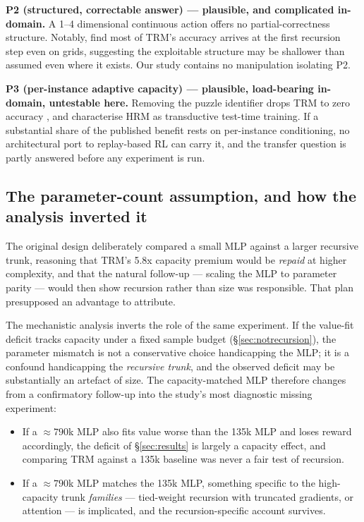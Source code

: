 \documentclass[11pt]{article}
\begin{document}
\textbf{P2 (structured, correctable answer) --- plausible, and complicated in-domain.} A 1--4 dimensional continuous action offers no partial-correctness structure. Notably, \citet{royeazar2026trm} find most of TRM's accuracy arrives at the first recursion step even on grids, suggesting the exploitable structure may be shallower than assumed even where it exists. Our study contains no manipulation isolating P2.

\textbf{P3 (per-instance adaptive capacity) --- plausible, load-bearing in-domain, untestable here.} Removing the puzzle identifier drops TRM to zero accuracy \citep{royeazar2026trm}, and \citet{arcprize2025hrm} characterise HRM as transductive test-time training. If a substantial share of the published benefit rests on per-instance conditioning, no architectural port to replay-based RL can carry it, and the transfer question is partly answered before any experiment is run.

\subsection{The parameter-count assumption, and how the analysis inverted it}
\label{sec:paramflip}

The original design deliberately compared a small MLP against a larger recursive trunk, reasoning that TRM's 5.8x capacity premium would be \emph{repaid} at higher complexity, and that the natural follow-up --- scaling the MLP to parameter parity --- would then show recursion rather than size was responsible. That plan presupposed an advantage to attribute.

The mechanistic analysis inverts the role of the same experiment. If the value-fit deficit tracks capacity under a fixed sample budget (\S\ref{sec:notrecursion}), the parameter mismatch is not a conservative choice handicapping the MLP; it is a confound handicapping the \emph{recursive trunk}, and the observed deficit may be substantially an artefact of size. The capacity-matched MLP therefore changes from a confirmatory follow-up into the study's most diagnostic missing experiment:

\begin{itemize}
  \item If a ${\approx}790$k MLP also fits value worse than the 135k MLP and loses reward accordingly, the deficit of \S\ref{sec:results} is largely a capacity effect, and comparing TRM against a 135k baseline was never a fair test of recursion.
  \item If a ${\approx}790$k MLP matches the 135k MLP, something specific to the high-capacity trunk \emph{families} --- tied-weight recursion with truncated gradients, or attention --- is implicated, and the recursion-specific account survives.
\end{itemize}
\end{document}
